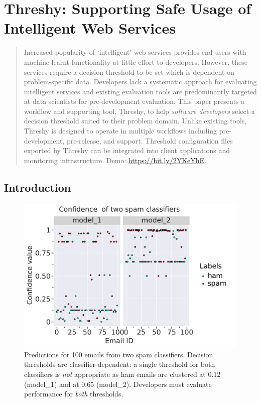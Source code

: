 \chapter[Supporting Safe Usage of Intelligent Web Services]
{Threshy: Supporting Safe Usage of Intelligent Web Services}
\label{ch:icse-demo2020}
\graphicspath{{mainmatter/publications/figures/icse-demo2020/}}

\def\demolink{https://bit.ly/2YKeYhE}

\begin{abstract}
Increased popularity of `intelligent' web services provides end-users with machine-learnt functionality at little effort to developers. However, these services require a decision threshold to be set which is dependent on problem-specific data. Developers lack a systematic approach for evaluating intelligent services and existing evaluation tools are predominantly targeted at data scientists for pre-development evaluation. This paper presents a workflow and supporting tool, Threshy, to help \textit{software developers} select a decision threshold suited to their problem domain. Unlike existing tools, Threshy is designed to operate in multiple workflows including pre-development, pre-release, and support. Threshold configuration files exported by Threshy can be integrated into client applications and monitoring infrastructure. 
Demo: \url{\demolink}.
\end{abstract}

\section{Introduction}

\begin{figure}[t]
    \centering
    \includegraphics[width=.7\linewidth]{scatter}
    \caption[Example case study of evaluating model performance in two different models]{Predictions for 100 emails from two spam classifiers. Decision thresholds are classifier-dependent:  a single threshold for both classifiers is \textit{not} appropriate as ham emails are clustered at 0.12 (model\_1) and at 0.65 (model\_2). Developers must evaluate  performance for \textit{both} thresholds.}
    \label{icse-demo2020:fig:example}
\end{figure}

